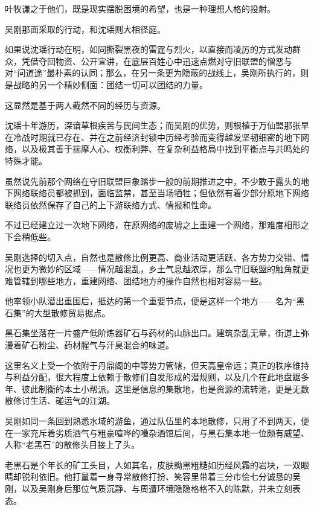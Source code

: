 叶牧谦之于他们，既是现实摆脱困境的希望，也是一种理想人格的投射。

\vspace{2em}

吴刚那面采取的行动，和沈瑶则大相径庭。

如果说沈瑶行动在明，如同撕裂黑夜的雷霆与烈火，以直接而凌厉的方式发动群众，凭借夺回物资、公开宣讲，在底层百姓心中迅速点燃对守旧联盟的憎恶与对“问道途”最朴素的认同；那么，在另一条更为隐蔽的战线上，吴刚所执行的，则是战略的另一个精妙侧面：团结一切可以团结的力量。

这显然是基于两人截然不同的经历与资源。

沈瑶十年游历，深谙草根疾苦与民间生态；而吴刚的优势，则根植于万仙盟那张早在冷战时期就已存在、并在之前经济封锁中历经考验而变得越发坚韧细密的地下网络，以及极其善于揣摩人心、权衡利弊、在复杂利益格局中找到平衡点与共鸣处的特殊才能。

虽然说先前那个网络在守旧联盟巨象踏步一般的前期推进之中，不少敢于露头的地下网络联络员都被抓到，面临监禁，甚至当场牺牲；但依然有着少部分原地下网络联络员依然保存了自己的上下游联络方式、情报和性命。

不过已经建立过一次地下网络，在原网络的废墟之上重建一个网络，那难度相形之下会稍低些。

吴刚选择的切入点，自然也是散修比例更高、商业活动更活跃、各方势力交错、情况也更为微妙的区域——情况越混乱，乡土气息越浓厚，那么守旧联盟的触角就更难管辖到哪些地方，重建网络、团结地方的操作自然也相对容易一些。

他率领小队潜出重围后，抵达的第一个重要节点，便是这样一个地方——名为“黑石集”的大型散修贸易据点。

\vspace{2em}

黑石集坐落在一片盛产低阶炼器矿石与药材的山脉出口。建筑杂乱无章，街道上弥漫着矿石粉尘、药材腥气与汗臭混合的味道。

这里名义上受一个依附于丹鼎阁的中等势力管辖，但天高皇帝远；真正的秩序维持与利益分配，很大程度上依赖于散修们自发形成的潜规则，以及几个在此地盘踞多年、彼此制衡的本土小帮派。这里是信息的集散地，也是资源的流转池，更是无数散修讨生活、碰运气的江湖。

吴刚如同一条回到熟悉水域的游鱼，通过队伍里的本地散修，只用了不到两天，便在一家充斥着劣质酒气与粗豪喧哗的嘈杂酒馆后间，与黑石集本地一位颇有威望、人称“老黑石”的散修头目接上了头。

老黑石是个年长的矿工头目，人如其名，皮肤黝黑粗糙如历经风霜的岩块，一双眼睛却锐利依旧。他打量着一身寻常散修打扮、笑容里带着三分市侩七分诚恳的吴刚，以及吴刚身后那位气质沉静、与周遭环境隐隐格格不入的陈默，并未立刻表态。

